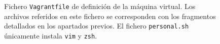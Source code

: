 \begin{figure}

	\caption{Fichero {\tt Vagrantfile} de definición de la máquina virtual. Los archivos referidos en este fichero se corresponden con los fragmentos detallados en los apartados previos. El fichero {\tt personal.sh} únicamente instala {\tt vim} y {\tt zsh}.}
	\label{fig:Vagrantfile}
\end{figure}